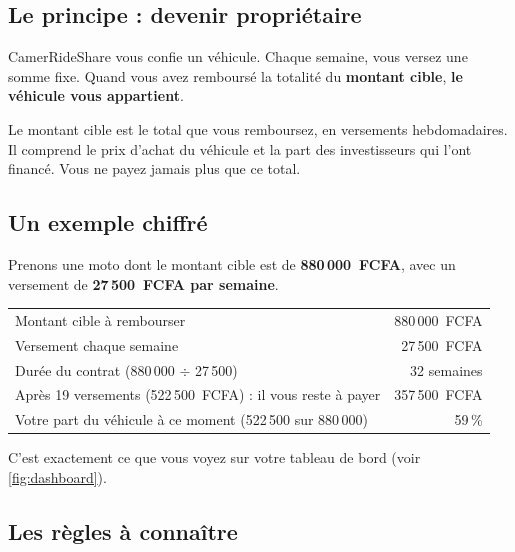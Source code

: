 \documentclass[11pt,a4paper]{article}
\newcommand{\Needspace}[1]{\par\ifdim\pagegoal<\maxdimen\ifdim\dimexpr\pagegoal-\pagetotal\relax<#1\relax\newpage\fi\fi}
\let\oldsubsection\subsection
\renewcommand{\subsection}{\Needspace{5.5cm}\oldsubsection}
\begin{document}
\subsection{Le principe : devenir propriétaire}

CamerRideShare vous confie un véhicule. Chaque semaine, vous versez une somme fixe. Quand vous avez remboursé la totalité du \textbf{montant cible}, \textbf{le véhicule vous appartient}.

\begin{retenir}
Le montant cible est le total que vous remboursez, en versements hebdomadaires. Il comprend le prix d'achat du véhicule et la part des investisseurs qui l'ont financé. Vous ne payez jamais plus que ce total.
\end{retenir}

\subsection{Un exemple chiffré}

Prenons une moto dont le montant cible est de \textbf{880\,000~FCFA}, avec un versement de \textbf{27\,500~FCFA par semaine}.

\begin{center}
\begin{tabularx}{0.92\linewidth}{@{}Xr@{}}
\toprule
Montant cible à rembourser & 880\,000~FCFA\\
Versement chaque semaine & 27\,500~FCFA\\
Durée du contrat (880\,000 $\div$ 27\,500) & 32 semaines\\
Après 19 versements (522\,500~FCFA) : il vous reste à payer & 357\,500~FCFA\\
Votre part du véhicule à ce moment (522\,500 sur 880\,000) & 59\,\%\\
\bottomrule
\end{tabularx}
\end{center}

C'est exactement ce que vous voyez sur votre tableau de bord (voir \autoref{fig:dashboard}).

\subsection{Les règles à connaître}
\end{document}
